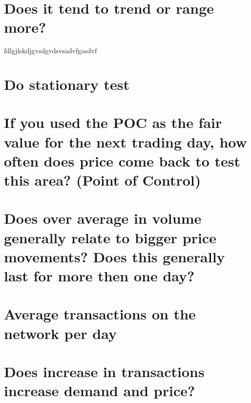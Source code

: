 \section{ Does it tend to trend or range more?}
fdlgjlskdjgvsdgvdsvsadvfgasdvf
\section{ Do stationary test}
\section{If you used the POC as the fair value for the next trading day, how often does price come back to test this area? (Point of Control)}
\section{Does over average in volume generally relate to bigger price movements? Does this generally last for more then one day?}
\section{Average transactions on the network per day}
\section{Does increase in transactions increase demand and price?}